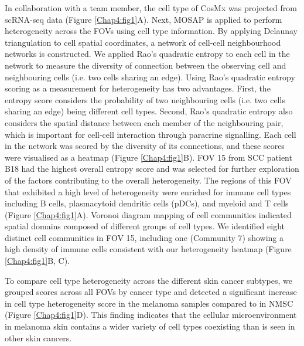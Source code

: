 In collaboration with a team member, the cell type of CosMx was projected from scRNA-seq data (Figure \ref{Chap4:fig1}A). Next, MOSAP is applied to perform heterogeneity across the FOVs using cell type information. By applying Delaunay triangulation to cell spatial coordinates, a network of cell-cell neighbourhood networks is constructed. We applied Rao’s quadratic entropy to each cell in the network to measure the diversity of connection between the observing cell and neighbouring cells (i.e. two cells sharing an edge). Using Rao’s quadratic entropy scoring as a measurement for heterogeneity has two advantages. First, the entropy score considers the probability of two neighbouring cells (i.e. two cells sharing an edge) being different cell types. Second, Rao’s quadratic entropy also considers the spatial distance between each member of the neighbouring pair, which is important for cell-cell interaction through paracrine signalling. Each cell in the network was scored by the diversity of its connections, and these scores were visualised as a heatmap (Figure \ref{Chap4:fig1}B). FOV 15 from SCC patient B18 had the highest overall entropy score and was selected for further exploration of the factors contributing to the overall heterogeneity. The regions of this FOV that exhibited a high level of heterogeneity were enriched for immune cell types including B cells, plasmacytoid dendritic cells (pDCs), and myeloid and T cells (Figure \ref{Chap4:fig1}A). Voronoi diagram mapping of cell communities indicated spatial domains composed of different groups of cell types. We identified eight distinct cell communities in FOV 15, including one (Community 7) showing a high density of immune cells consistent with our heterogeneity heatmap (Figure \ref{Chap4:fig1}B, C).  

To compare cell type heterogeneity across the different skin cancer subtypes, we grouped scores across all FOVs by cancer type and detected a significant increase in cell type heterogeneity score in the melanoma samples compared to in NMSC (Figure \ref{Chap4:fig1}D). This finding indicates that the cellular microenvironment in melanoma skin contains a wider variety of cell types coexisting than is seen in other skin cancers.

